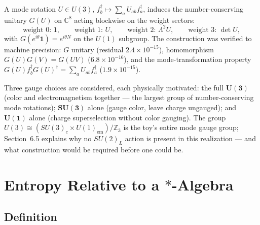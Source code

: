 \documentclass[11pt]{article}
\newcommand{\CC}{\mathbb{C}}
\begin{document}
A mode rotation $U \in U(3)$, $f_b^\dagger \mapsto \sum_a U_{ab} f_a^\dagger$, induces the number-conserving unitary $G(U)$ on $\CC^8$ acting blockwise on the weight sectors:
\begin{equation*}
\text{weight 0: } 1, \qquad
\text{weight 1: } U, \qquad
\text{weight 2: } \Lambda^2 U, \qquad
\text{weight 3: } \det U,
\end{equation*}
with $G(e^{i\theta}\mathbf{1}) = e^{i\theta N}$ on the $U(1)$ subgroup. The construction was verified to machine precision: $G$ unitary (residual $2.4 \times 10^{-15}$), homomorphism $G(U)G(V) = G(UV)$ ($6.8 \times 10^{-16}$), and the mode-transformation property $G(U) f_b^\dagger G(U)^\dagger = \sum_a U_{ab} f_a^\dagger$ ($1.9 \times 10^{-15}$).

Three gauge choices are considered, each physically motivated: the full $\boldsymbol{U(3)}$ (color and electromagnetism together --- the largest group of number-conserving mode rotations); $\boldsymbol{SU(3)}$ alone (gauge color, leave charge ungauged); and $\boldsymbol{U(1)}$ alone (charge superselection without color gauging). The group $U(3) \cong (SU(3)_c \times U(1)_{\mathrm{em}})/\mathbb{Z}_3$ is the toy's entire mode gauge group; Section~6.5 explains why no $SU(2)_L$ action is present in this realization --- and what construction would be required before one could be.

\section{Entropy Relative to a \texorpdfstring{$*$}{*}-Algebra}

\subsection{Definition}
\end{document}
